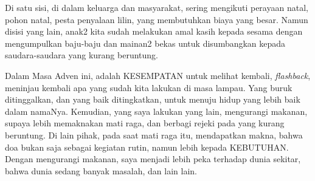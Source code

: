 Di satu sisi, di dalam keluarga dan masyarakat, sering mengikuti perayaan natal, pohon natal, pesta penyalaan lilin, yang membutuhkan biaya yang besar. Namun disisi yang lain, anak2 kita sudah melakukan amal kasih kepada sesama dengan mengumpulkan baju-baju dan mainan2 bekas untuk disumbangkan kepada saudara-saudara yang kurang beruntung.

Dalam Masa Adven ini, adalah KESEMPATAN untuk melihat kembali, \textit{flashback}, meninjau kembali apa yang sudah kita lakukan di masa lampau. Yang buruk ditinggalkan, dan yang baik ditingkatkan, untuk menuju hidup yang lebih baik dalam namaNya. Kemudian, yang saya lakukan yang lain, mengurangi makanan, supaya lebih memaknakan mati raga, dan berbagi rejeki pada yang kurang beruntung. Di lain pihak, pada saat mati raga itu, mendapatkan makna, bahwa doa bukan saja sebagai kegiatan rutin, namun lebih kepada KEBUTUHAN. Dengan mengurangi makanan, saya menjadi lebih peka terhadap dunia sekitar, bahwa dunia sedang banyak masalah, dan lain lain. 

\normalsize